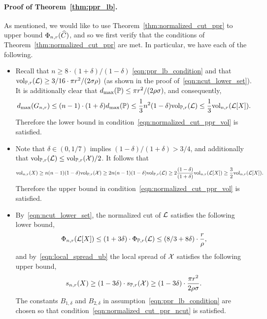 \paragraph{Proof of Theorem~\ref{thm:ppr_lb}.}
	As mentioned, we would like to use Theorem~\ref{thm:normalized_cut_ppr} to upper bound $\Phi_{n,r}(\widehat{C})$, and so we first verify that the conditions of Theorem~\ref{thm:normalized_cut_ppr} are met. In particular, we have each of the following.
	\begin{itemize}
		\item Recall that $n \geq 8 \cdot (1 + \delta)/(1 - \delta)$ \eqref{eqn:ppr_lb_condition} and that $\mathrm{vol}_{\mathbb{P},r}(\mathcal{L}) \geq 3/16 \cdot \pi r^2/(2\sigma\rho)$ (as shown in the proof of~\eqref{eqn:ncut_lower_set}). It is additionally clear that $d_{\max}(\mathbb{P}) \leq \pi r^2 /(2\rho\sigma)$, and consequently,
		\begin{equation}
		\label{pf:ppr_lb_1}
		d_{\max}(G_{n,r}) \leq (n - 1) \cdot (1 + \delta) d_{\max}(\mathbb{P}) \leq \frac{1}{3}n^2 (1 - \delta) \mathrm{vol}_{\mathbb{P},r}(\mathcal{L}) \leq \frac{1}{3}\mathrm{vol}_{n,r}(\mathcal{L}[X]).
		\end{equation}
		Therefore the lower bound in condition~\eqref{eqn:normalized_cut_ppr_vol} is satisfied.
		\item Note that $\delta \in (0,1/7)$ implies $(1 - \delta)/(1 + \delta) > 3/4$, and additionally that $\mathrm{vol}_{\mathbb{P},r}(\mathcal{L}) \leq \mathrm{vol}_{\mathbb{P},r}(\mathcal{X})/2$. It follows that
		\begin{equation}
		\label{pf:ppr_lb_2}
		\mathrm{vol}_{n,r}(X) \geq n(n - 1)(1 - \delta) \mathrm{vol}_{\mathbb{P},r}(\mathcal{X}) \geq 2n(n - 1) (1 - \delta) \mathrm{vol}_{\mathbb{P},r}(\mathcal{L}) \geq 2\frac{(1 - \delta)}{(1 + \delta)} \mathrm{vol}_{n,r}(\mathcal{L}[X]) \geq \frac{3}{2} \mathrm{vol}_{n,r}(\mathcal{L}[X]).
		\end{equation}
		Therefore the upper bound in condition~\eqref{eqn:normalized_cut_ppr_vol} is satisfied.
		\item By~\eqref{eqn:ncut_lower_set}, the normalized cut of $\mathcal{L}$ satisfies the following lower bound,
		\begin{equation}
		\Phi_{n,r}(\mathcal{L}[X]) \leq (1 + 3\delta) \cdot \Phi_{\mathbb{P},r}(\mathcal{L}) \leq (8/3 + 8\delta) \cdot  \frac{r}{\rho}, 
		\end{equation}
		and by~\eqref{eqn:local_spread_ub} the local spread of $\mathcal{X}$ satisfies the following upper bound,
		\begin{equation}
		s_{n,r}(X) \geq (1 - 3\delta) \cdot s_{\mathbb{P},r}(\mathcal{X}) \geq (1 - 3\delta) \cdot \frac{\pi r^2}{2\rho\sigma}.
		\end{equation}
		The constants $B_{1,\delta}$ and $B_{2,\delta}$ in assumption~\eqref{eqn:ppr_lb_condition} are chosen so that condition~\eqref{eqn:normalized_cut_ppr_ncut} is satisfied.
	\end{itemize}
